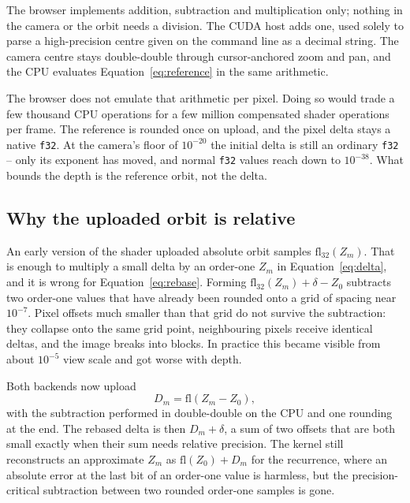 \documentclass[10pt,a4paper]{article}
\begin{document}
The browser implements addition, subtraction and multiplication only; nothing
in the camera or the orbit needs a division. The CUDA host adds one, used
solely to parse a high-precision centre given on the command line as a decimal
string. The camera centre stays double-double through cursor-anchored zoom and
pan, and the CPU evaluates Equation~\ref{eq:reference} in the same arithmetic.

The browser does not emulate that arithmetic per pixel. Doing so would trade a
few thousand CPU operations for a few million compensated shader operations
per frame. The reference is rounded once on upload, and the pixel delta stays a
native \texttt{f32}. At the camera's floor of \(10^{-20}\) the initial delta is
still an ordinary \texttt{f32} -- only its exponent has moved, and normal
\texttt{f32} values reach down to \(10^{-38}\). What bounds the depth is the
reference orbit, not the delta.

\subsection{Why the uploaded orbit is relative}
\label{sec:relative}

An early version of the shader uploaded absolute orbit samples
\(\mathrm{fl}_{32}(Z_m)\). That is enough to multiply a small delta by an
order-one \(Z_m\) in Equation~\ref{eq:delta}, and it is wrong for
Equation~\ref{eq:rebase}. Forming \(\mathrm{fl}_{32}(Z_m)+\delta-Z_0\)
subtracts two order-one values that have already been rounded onto a grid of
spacing near \(10^{-7}\). Pixel offsets much smaller than that grid do not
survive the subtraction: they collapse onto the same grid point, neighbouring
pixels receive identical deltas, and the image breaks into blocks. In practice
this became visible from about \(10^{-5}\) view scale and got worse with depth.

Both backends now upload
\begin{equation}
  D_m = \mathrm{fl}(Z_m-Z_0),
  \label{eq:relative}
\end{equation}
with the subtraction performed in double-double on the CPU and one rounding at
the end. The rebased delta is then \(D_m+\delta\), a sum of two offsets that
are both small exactly when their sum needs relative precision. The kernel
still reconstructs an approximate \(Z_m\) as \(\mathrm{fl}(Z_0)+D_m\) for the
recurrence, where an absolute error at the last bit of an order-one value is
harmless, but the precision-critical subtraction between two rounded order-one
samples is gone.
\end{document}
